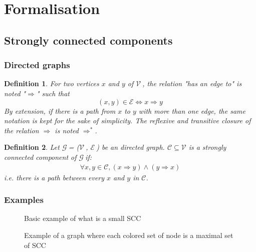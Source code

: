 \documentclass[a4 paper, 12pt]{article}
\def\GG{$\mathcal{G}~$}
\def\VV{$\mathcal{V}~$}
\def\EE{$\mathcal{E}~$}
\newtheorem{definition}{Definition}
\begin{document}
\section{Formalisation}
\subsection{Strongly connected components}
\subsubsection{Directed graphs}
\begin{definition}
    For two vertices $x$ and $y$ of \VV, the relation "has an edge to" is noted "$\Rightarrow$" such that
    \begin{equation*}
        (x, y) \in \mathcal{E} \Longleftrightarrow x \Rightarrow y
    \end{equation*}
    By extension, if there is a path from $x$ to $y$ with more than one edge, the same notation is kept for the sake of simplicity.
    The reflexive and transitive closure of the relation $\Rightarrow$ is noted $\Rightarrow^*$.
\end{definition}

\begin{definition}
    Let \GG = (\VV, \EE) be an directed graph.
$\mathcal{C} \subseteq \mathcal{V}$ is a strongly connected component of \GG if:
\begin{gather*}
    \forall x, y \in \mathcal{C}, (x \Rightarrow y) \wedge (y \Rightarrow x)
\end{gather*}
\textit{i.e.} there is a path between every $x$ and $y$ in $\mathcal{C}$.\\

\end{definition}

\subsubsection{Examples}
\begin{figure}[!h]
    \centering
    \begin{subfigure}[t]{.49\textwidth}
    \end{subfigure}
    \begin{subfigure}[t]{.49\textwidth}
    \end{subfigure}
    \caption{Basic example of what is a small SCC}
\end{figure}
\begin{figure}[!h]
    \caption{Example of a graph where each colored set of node is a maximal set of SCC\label{fig:exampleSCC}}
\end{figure}
\end{document}
